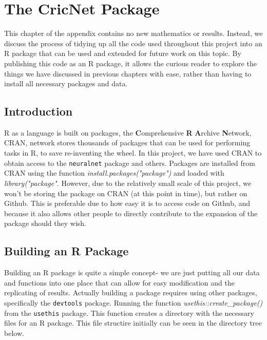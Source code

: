 \chapter{The CricNet Package}

This chapter of the appendix contains no new mathematics or results. Instead, we discuss the process of tidying up all the code used throughout this project into an R package that can be used and extended for future work on this topic. By publishing this code as an R package, it allows the curious reader to explore the things we have discussed in previous chapters with ease, rather than having to install all necessary packages and data.\\

\section{Introduction}

R as a language is built on packages, the \textbf{C}omprehensive \textbf{R} \textbf{A}rchive \textbf{N}etwork, CRAN, network stores thousands of packages that can be used for performing tasks in R, to save re-inventing the wheel. In this project, we have used CRAN to obtain 
access to the \verb|neuralnet| package and others. 
Packages are installed from CRAN using the function \textit{install.packages("package")} and loaded with \textit{library("package"}. However, due to the relatively small scale of this project, we won't be storing the package on CRAN (at this point in time), but rather on Github. This is preferable due to how easy it is to access code on Github, and because it also allows other people to directly contribute to the expansion of the package should they wish.  

\section{Building an R Package}

Building an R package is quite a simple concept- we are just putting all our data and functions into one place that can allow for easy modification and the replicating of results. Actually building a package requires using other packages, specifically the \verb|devtools| package. Running the function \textit{usethis::create\_package()} from the \verb|usethis| package. This function creates a directory with the necessary files for an R package. This file structire initially can be seen in the directory tree below. \\

